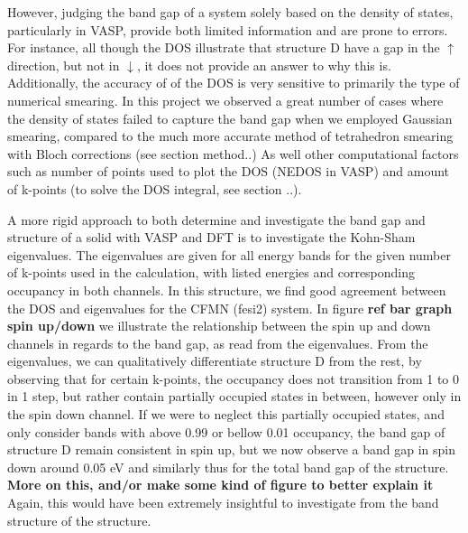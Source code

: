 However, judging the band gap of a system solely based on the density of states, particularly in VASP, provide both limited information and are prone to errors. For instance, all though the DOS illustrate that structure D have a gap in the $\uparrow$ direction, but not in $\downarrow$, it does not provide an answer to why this is. Additionally, the accuracy of of the DOS is very sensitive to primarily the type of numerical smearing. In this project we observed a great number of cases where the density of states failed to capture the band gap when we employed Gaussian smearing, compared to the much more accurate method of tetrahedron smearing with Bloch corrections (see section method..)  As well other computational factors such as number of points used to plot the DOS (NEDOS in VASP) and amount of k-points (to solve the DOS integral, see section ..). 

A more rigid approach to both determine and investigate the band gap and structure of a solid with VASP and DFT is to investigate the Kohn-Sham eigenvalues. The eigenvalues are given for all energy bands for the given number of k-points used in the calculation, with listed energies and corresponding occupancy in both channels. In this structure, we find good agreement between the DOS and eigenvalues for the CFMN (fesi2) system. In figure \textbf{ref bar graph spin up/down} we illustrate the relationship between the spin up and down channels in regards to the band gap, as read from the eigenvalues. From the eigenvalues, we can qualitatively differentiate structure D from the rest, by observing that for certain k-points, the occupancy does not transition from 1 to 0 in 1 step, but rather contain partially occupied states in between, however only in the spin down channel. If we were to neglect this partially occupied states, and only consider bands with above 0.99 or bellow 0.01 occupancy, the band gap of structure D remain consistent in spin up, but we now observe a band gap in spin down around 0.05 eV and similarly thus for the total band gap of the structure. \textbf{More on this, and/or make some kind of figure to better explain it}
Again, this would have been extremely insightful to investigate from the band structure of the structure.

